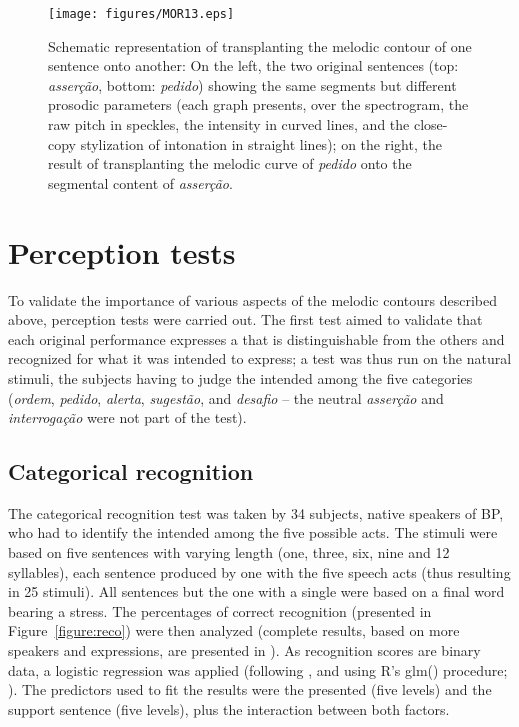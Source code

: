 \documentclass[output=paper]{LSP/langsci}
\begin{document}
\begin{figure}

\texttt{[image: figures/MOR13.eps]}
\caption{Schematic representation of transplanting the melodic contour of one sentence onto another: On the left, the two original sentences (top: \textit{asserção}, bottom: \textit{pedido}) showing the same segments but different prosodic parameters (each graph presents, over the spectrogram, the raw pitch in speckles, the intensity in curved lines, and the close-copy stylization of intonation in straight lines); on the right, the result of transplanting the melodic curve of \textit{pedido} onto the segmental content of \textit{asserção}.}
\label{figure:Transplantation}
\end{figure}


\section{Perception tests}
\label{perception}

To validate the importance of various aspects of the melodic contours described above, perception tests were carried out. 
The first test aimed to validate that each original performance expresses a  that is distinguishable from the others and recognized for what it was intended to express; a  test was thus run on the natural stimuli, the subjects having to judge the intended  among the five categories (\textit{ordem}, \textit{pedido}, \textit{alerta}, \textit{sugestão}, and \textit{desafio} -- the neutral \textit{asserção} and \textit{interrogação} were not part of the test).


\subsection{Categorical recognition}
\label{perception:categorical}

The categorical recognition test was taken by 34 subjects, native speakers of BP, who had to identify the intended  among the five possible acts. 
The stimuli were based on five sentences with varying length (one, three, six, nine and 12 syllables), each sentence produced by one  with the five speech acts (thus resulting in 25 stimuli). 
All sentences but the one with a single  were based on a final word bearing a  stress. 
The percentages of correct recognition (presented in Figure~\ref{figure:reco}) were then analyzed (complete results, based on more speakers and expressions, are presented in \citealt{moraes2014}). 
As recognition scores are binary data, a logistic regression was applied (following \citealt[][196]{baayen2008analyzing}, and using R's glm() procedure; \citealt{Rtool}). 
The predictors used to fit the results were the presented  (five levels) and the support sentence (five levels), plus the interaction between both factors.
\end{document}
